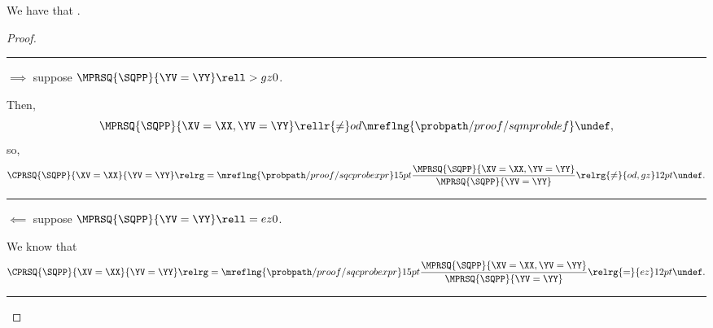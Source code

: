 \begin{proposition}
  We have that \sqcpproblimdefprop.%
\end{proposition}

\begin{proof}
  \hrule
  $\implies$ suppose $\MPRSQ{\SQPP}{\YV = \YY} \rell > gz 0$.

  Then,
  $$\MPRSQ{\SQPP}{\XV = \XX, \YV = \YY}
  \rellr {\ne} od {\mreflng{\probpath/proof/sqmprobdef}}
  \undef,$$
  so, 
  $$ \CPRSQ{\SQPP}{\XV = \XX}{\YV = \YY} 
  \relrg = {\mreflng{\probpath/proof/sqcprobexpr}} 15pt
  \frac{\MPRSQ{\SQPP}{\XV = \XX, \YV = \YY}}{\MPRSQ{\SQPP}{\YV = \YY}}
  \relrg {\ne} {od,gz} 12pt \undef.$$
  \hrule
  $\impliedby$ suppose $\MPRSQ{\SQPP}{\YV = \YY} \rell = ez 0$.

  We know that
  $$ \CPRSQ{\SQPP}{\XV = \XX}{\YV = \YY} 
  \relrg = {\mreflng{\probpath/proof/sqcprobexpr}} 15pt
  \frac{\MPRSQ{\SQPP}{\XV = \XX, \YV = \YY}}{\MPRSQ{\SQPP}{\YV = \YY}}
  \relrg {=} {ez} 12pt \undef.$$
  \hrule
\end{proof}
